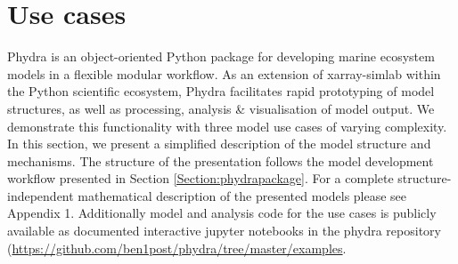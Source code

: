 \documentclass[template.tex]{subfiles}
\begin{document}
\section{Use cases} \label{usecases}

Phydra is an object-oriented Python package for developing marine ecosystem models in a flexible modular workflow. As an extension of xarray-simlab within the Python scientific ecosystem, Phydra facilitates rapid prototyping of model structures, as well as processing, analysis \& visualisation of model output. We demonstrate this functionality with three model use cases of varying complexity. \\

In this section, we present a simplified description of the model structure and mechanisms. The structure of the presentation follows the model development workflow presented in Section \ref{Section:phydrapackage}.
For a complete structure-independent mathematical description of the presented models please see Appendix 1. Additionally model and analysis code for the use cases is publicly available as documented interactive jupyter notebooks in the phydra repository (\url{https://github.com/ben1post/phydra/tree/master/examples}. \\
\end{document}
